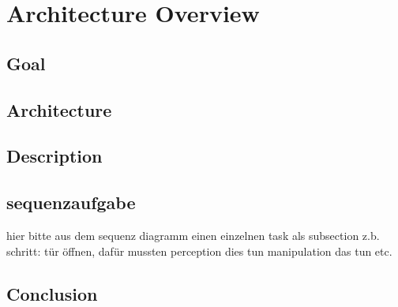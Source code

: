 \documentclass[main.tex]{subfiles}
\begin{document}
	\begingroup

	\renewcommand{\cleardoublepage}{}

	\renewcommand{\clearpage}{}

	\chapter{Architecture Overview}

		\chapterauthor{}
		
		\section{Goal}
		
		\section{Architecture}
		
		\section{Description}
	  	
	  	\section{sequenzaufgabe}
		hier bitte aus dem sequenz diagramm einen einzelnen task als subsection z.b. schritt: tür öffnen, dafür mussten perception dies tun manipulation das tun etc.
		
		\section{Conclusion}
		
		
	\endgroup
\end{document}
